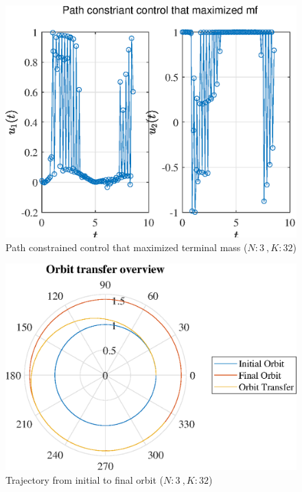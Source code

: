 \documentclass[]{article}
\begin{document}
	\begin{figure}
		\centering
		\includegraphics[scale=0.75]{path_N3_K32_C3_mf.eps}
		\caption{Path constrained control that maximized terminal mass (\(N:3\ , K:32\))}
		\label{fig:path_N3_K32_C3_mf}
	\end{figure}
	\begin{figure}
		\centering
		\includegraphics[scale=0.75]{orbit_N3_K32_C3_mf.eps}
		\caption{Trajectory from initial to final orbit (\(N:3\ , K:32\))}
		\label{fig:orbit_N3_K32_C3_mf}
	\end{figure}
\end{document}
